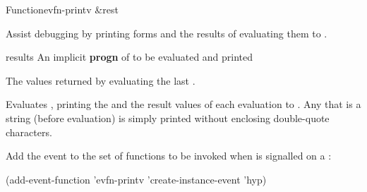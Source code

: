 \documentclass[10pt,twoside,english,pdftex]{article}
\begin{document}

\begin{functiondoc}{Function}{evfn-printv}{ 
    \&rest }
% 

\fnsyntax

\fnpurpose Assist debugging by printing forms and the results of
evaluating them to .

\fnpackage {}

\fnmodule {}

\fnargs
\begin{args}{results}
\arg[forms] An implicit \textbf{progn} of  to be
evaluated and printed  
\end{args}

\fnreturns The values returned by evaluating the last .

\fndescription Evaluates , printing the  and the
result values of each evaluation to .  Any
that is a string (before evaluation) is simply printed without enclosing
double-quote characters.

\fnexamples
{}%
Add the event   to the set of functions
to be invoked when  is signalled on a
 :
\begin{example}
  (add-event-function 'evfn-printv 'create-instance-event 'hyp)
\end{example}


\end{functiondoc}

\end{document}
